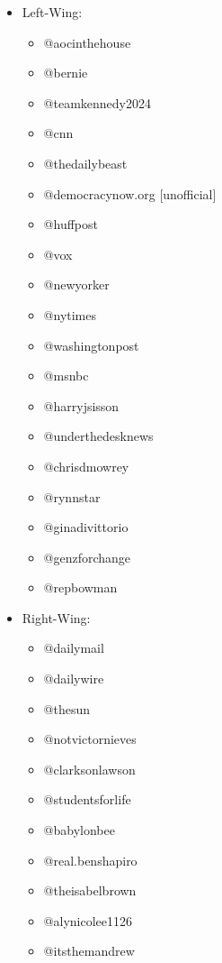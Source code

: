 \begin{itemize}
    \item Left-Wing: 
        \begin{itemize}
            \item @aocinthehouse \cite{wikiDem,yougovDem}
            \item @bernie \cite{wikiDem,yougovDem}
            \item @teamkennedy2024 \cite{wikiDem,yougovDem}
            \item @cnn \cite{biasCheck1,biasCheck2}
            \item @thedailybeast \cite{biasCheck1,biasCheck2}
            \item @democracynow.org [unofficial]
            \item @huffpost \cite{biasCheck1,biasCheck2}
            \item @vox \cite{biasCheck1,biasCheck2}
            \item @newyorker \cite{biasCheck1,biasCheck2}
            \item @nytimes \cite{biasCheck1,biasCheck2}
            \item @washingtonpost \cite{biasCheck1,biasCheck2}
            \item @msnbc \cite{biasCheck1,biasCheck2}
            \item @harryjsisson \cite{foxRight}
            \item @underthedesknews \cite{foxRight}
            \item @chrisdmowrey \cite{foxRight}
            \item @rynnstar \cite{https://doi.org/10.1002/poi3.287}
            \item @ginadivittorio \cite{NYTpayInfluencers}
            \item @genzforchange \cite{climateCulture}
            \item @repbowman \cite{politico}
        \end{itemize}
    \item Right-Wing:
        \begin{itemize}
            \item @dailymail \cite{biasCheck1,biasCheck2}
            \item @dailywire \cite{biasCheck1,biasCheck2}
            \item @thesun \cite{biasCheck1,biasCheck2}
            \item @notvictornieves \cite{foxRight}
            \item @clarksonlawson \cite{foxRight}
            \item @studentsforlife \cite{foxProFreeSpech}
            \item @babylonbee \cite{foxProFreeSpech}
            \item @real.benshapiro \cite{doi:10.1177/20563051231177938}
            \item @theisabelbrown \cite{mozilla}
            \item @alynicolee1126 \cite{mozilla}
            \item @itsthemandrew \cite{mozilla}
        \end{itemize}
\end{itemize}
